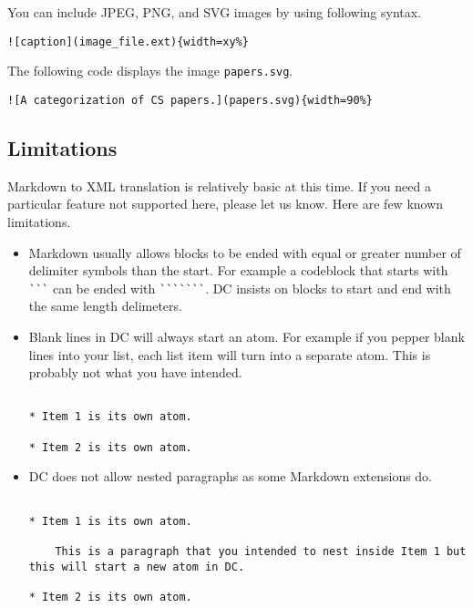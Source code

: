 \begin{flex}
\begin{gram}
You can include JPEG, PNG, and SVG images by using following syntax.
\begin{lstlisting}
![caption](image_file.ext){width=xy%}
\end{lstlisting}
\end{gram}

\begin{example}
The following code displays the image \lstinline`papers.svg`.
\begin{lstlisting}
![A categorization of CS papers.](papers.svg){width=90%}
\end{lstlisting}
\end{example}
\end{flex}

\subsection{Limitations}

Markdown to XML translation is relatively basic at this time.  If you need a particular feature not supported here, please let us know.
%
Here are few known limitations.
\begin{itemize}
\item Markdown usually allows blocks to be ended with equal or greater number of delimiter symbols than the start. For example a codeblock that starts with \lstinline!```! can be ended with \lstinline!```````!.  DC insists on blocks to start and end with the same length delimeters.

\item Blank lines in DC will always start an atom.  For example if you pepper blank lines into your list, each list item will turn into a separate atom.  This is probably not what you have intended.  
\begin{lstlisting}

* Item 1 is its own atom.

* Item 2 is its own atom.

\end{lstlisting}

\item DC does not allow nested paragraphs as some Markdown extensions do.  

\begin{lstlisting}

* Item 1 is its own atom.

    This is a paragraph that you intended to nest inside Item 1 but  this will start a new atom in DC.  

* Item 2 is its own atom.

\end{lstlisting}

\end{itemize}


